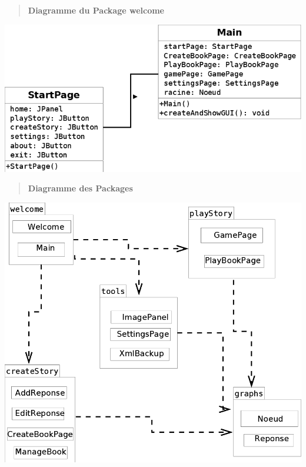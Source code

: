 \documentclass[12pt]{article}
\begin{document}
		\begin{center}
		\begin{verse}
		    \begin{center}
		       \textbf{Diagramme du Package welcome} 
		    \end{center}
		\end{verse}
			\newcommand{\umlscale}{0.4}
			\includegraphics[scale=\umlscale]{./images/packageWelcome.png}
		\end{center}
		
	    \newpage
		\begin{center}
		\begin{verse}
		    \begin{center}
		       \textbf{Diagramme des Packages} 
		    \end{center}
		\end{verse}
			\newcommand{\umlscale}{0.4}
			\includegraphics[scale=\umlscale]{./images/packageDiagram.png}
		\end{center}
	
\end{document}
